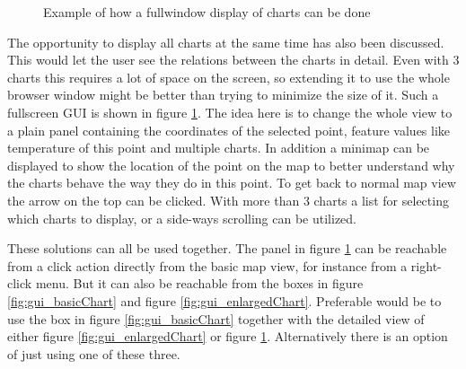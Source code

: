 \documentclass[11pt,a4paper,titlepage,oneside]{report}
\begin{document}
\begin{figure}[!htb]
  \begin{center}
    \caption{Example of how a fullwindow display of charts can be done}
    \label{fig:gui_panelChart}
  \end{center}
\end{figure}

The opportunity to display all charts at the same time has also been discussed. This would let the user see the relations between the charts in detail. Even with 3 charts this requires a lot of space on the screen, so extending it to use the whole browser window might be better than trying to minimize the size of it. Such a fullscreen \gls{GUI} is shown in figure \ref{fig:gui_panelChart}. The idea here is to change the whole view to a plain panel containing the coordinates of the selected point, feature values like temperature of this point and multiple charts. In addition a minimap can be displayed to show the location of the point on the map to better understand why the charts behave the way they do in this point. To get back to normal map view the arrow on the top can be clicked. With more than 3 charts a list for selecting which charts to display, or a side-ways scrolling can be utilized.

These solutions can all be used together. The panel in figure \ref{fig:gui_panelChart} can be reachable from a click action directly from the basic map view, for instance from a right-click menu. But it can also be reachable from the boxes in figure \ref{fig:gui_basicChart} and figure \ref{fig:gui_enlargedChart}. Preferable would be to use the box in figure \ref{fig:gui_basicChart} together with the detailed view of either figure \ref{fig:gui_enlargedChart} or figure \ref{fig:gui_panelChart}. Alternatively there is an option of just using one of these three.
\end{document}
